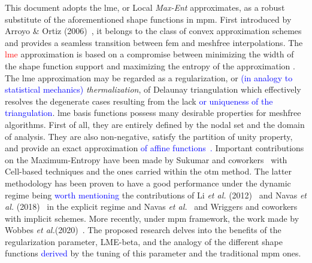 \documentclass[preprint,12pt,a4paper]{elsarticle}
\begin{document}
This document adopts the \acrfull{lme}, or Local \textit{Max-Ent} approximates, as a robust substitute of the aforementioned shape functions in \acrshort{mpm}. First introduced by Arroyo \& Ortiz
(2006)~\cite{Arroyo2006}, it belongs to the class of convex 
approximation schemes and provides a seamless transition between
\acrshort{fem} and meshfree interpolations. The \textcolor{red}{\acrshort{lme}}
approximation is based on a compromise between minimizing the
width of the shape function support and maximizing the
entropy of the approximation \cite{Arroyo2006}. The \acrshort{lme} approximation
may be regarded as a regularization, or \textcolor{blue}{(in analogy to statistical mechanics)} \textit{thermalization}, of
Delaunay triangulation which effectively resolves the degenerate cases
resulting from the lack \textcolor{blue}{or uniqueness of the triangulation}. \acrshort{lme} basis functions possess many desirable properties for
meshfree algorithms. First of all, they are entirely defined by the
nodal set and the domain of analysis. They are also non-negative,
satisfy the partition of unity property, and provide an exact
approximation \textcolor{blue}{of affine functions~\cite{Arroyo2006}.} Important contributions on the Maximum-Entropy have been made by Sukumar and coworkers~\cite{Sukumar15} with Cell-based techniques and the ones carried within the \acrfull{otm} method. The latter methodology has been proven to have a good performance under
the dynamic regime being \textcolor{blue}{worth mentioning} the contributions of Li {\it et al.} (2012)~\cite{Li2012} and Navas {\it et al.}
(2018)~\cite{Navas:17b,Navas2018a} in the explicit regime and Navas
{\it et al.}~\cite{Navas2016,Navas2016b,Navas:17c} and Wriggers and
coworkers~\cite{Wriggers18} with implicit schemes. More
recently, under \acrshort{mpm} framework, the work made by Wobbes {\it et al.}(2020)~\cite{Wobbes2020}. The proposed research delves into the benefits of the regularization parameter, \gls{LME-beta}, and the analogy of the different shape functions \textcolor{blue}{derived} by the tuning of this parameter and the traditional \acrshort{mpm} ones.
\end{document}
